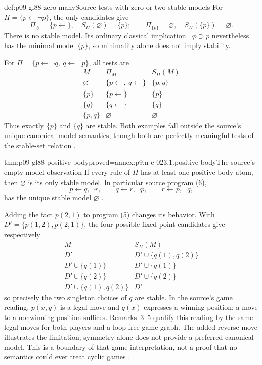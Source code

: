 \begin{hbexample}{def:p09-gl88-zero-many}{Source tests with zero or two stable models}
For \(\Pi=\{p\leftarrow\neg p\}\), the only candidates give
\[
 \Pi_{\varnothing}=\{p\leftarrow\},\quad
 S_\Pi(\varnothing)=\{p\};\qquad
 \Pi_{\{p\}}=\varnothing,\quad S_\Pi(\{p\})=\varnothing.
\]
There is no stable model.  Its ordinary classical implication
\(\neg p\supset p\) nevertheless has the minimal model \(\{p\}\),
so minimality alone does not imply stability.

For \(\Pi=\{p\leftarrow\neg q,\ q\leftarrow\neg p\}\), all tests are
\[
\begin{array}{c|c|c}
 M&\Pi_M&S_\Pi(M)\\\hline
 \varnothing&\{p\leftarrow,\ q\leftarrow\}&\{p,q\}\\
 \{p\}&\{p\leftarrow\}&\{p\}\\
 \{q\}&\{q\leftarrow\}&\{q\}\\
 \{p,q\}&\varnothing&\varnothing
\end{array}
\]
Thus exactly \(\{p\}\) and \(\{q\}\) are stable.  Both examples fall
outside the source's unique-canonical-model semantics, though both are
perfectly meaningful tests of the stable-set relation
\cite[\S3, p.~7]{GelfondLifschitz1988}.
\end{hbexample}

\begin{hbcorollary}{thm:p09-gl88-positive-body}{proved=annex:p9.n-c-023.1.positive-body}{The source's empty-model observation}
If every rule of \(\Pi\) has at least one positive body atom, then
\(\varnothing\) is its only stable model.  In particular source program (6),
\[
 p\leftarrow q,\neg r,\qquad
 q\leftarrow r,\neg p,\qquad
 r\leftarrow p,\neg q,
\]
has the unique stable model \(\varnothing\)
\cite[\S3, pp.~6--7]{GelfondLifschitz1988}.
\end{hbcorollary}

Adding the fact \(p(2,1)\) to program (5) changes its behavior.  With
\(D'=\{p(1,2),p(2,1)\}\), the four possible fixed-point candidates give
respectively
\[
\begin{array}{c|c}
 M&S_\Pi(M)\\\hline
 D'&D'\cup\{q(1),q(2)\}\\
 D'\cup\{q(1)\}&D'\cup\{q(1)\}\\
 D'\cup\{q(2)\}&D'\cup\{q(2)\}\\
 D'\cup\{q(1),q(2)\}&D'
\end{array}
\]
so precisely the two singleton choices of \(q\) are stable.  In the source's
game reading, \(p(x,y)\) is a legal move and \(q(x)\) expresses a winning
position: a move to a nonwinning position suffices.  Remarks~3--5 qualify this
reading by the same legal moves for both players and a loop-free game graph.
The added reverse move illustrates the limitation; symmetry alone does not
provide a preferred canonical model.  This is a boundary of that game
interpretation, not a proof that no semantics could ever treat cyclic games
\cite[\S3, pp.~6--7]{GelfondLifschitz1988}.

